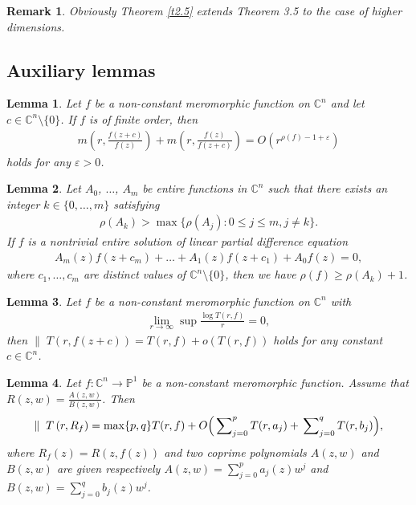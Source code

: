 \documentclass[11pt,reqno]{amsart}
\newtheorem{lem}{Lemma}[section]
\newtheorem{rem}{Remark}[section]
\newcommand{\beas}{\begin{eqnarray*}}
\newcommand{\eeas}{\end{eqnarray*}}
\numberwithin{equation}{section}
\begin{document}
\begin{rem} Obviously Theorem \ref{t2.5} extends Theorem 3.5 \cite{Liu-Dong-2014} to the case of higher dimensions.
\end{rem}

\subsection{{\bf Auxiliary lemmas}}
\begin{lem}\label{L2.1}\cite[Theorem 2.4]{Cao-Xu-2020} Let $f$ be a non-constant meromorphic function on $\mathbb{C}^n$ and let $c \in \mathbb{C}^n\setminus \{0\} $. If $f$ is of finite order, then 
\begin{align*}
 m\left(r,\frac{f(z+c)}{f(z)}\right)+m\left(r, \frac{f(z)}{f(z+c)}\right)=O\left(r^{\rho(f)-1+\varepsilon}\right)
 \end{align*}
holds for any $\varepsilon>0$.
\end{lem}

\begin{lem}\label{L2.2}\cite[Corollary 3.2]{Cao-Xu-2020} Let $A_0$, $\ldots$, $A_m$ be entire functions in $\mathbb{C}^n$ such that there exists an integer $k \in \{0, \ldots, m\}$ satisfying 
\begin{align*}
\rho(A_k)>\max \{\rho(A_j): 0 \le j \le m, j \ne k\}.
\end{align*}
If $f$ is a nontrivial entire solution of linear partial difference equation 
\begin{align*}
A_m(z)f(z+c_m)+\ldots+A_1(z)f(z+c_1)+A_0f(z)=0,
\end{align*}
 where $c_1,\ldots,c_m$ are distinct values of $\mathbb{C}^n\setminus\{0\}$, then we have $\rho(f)\ge \rho(A_k)+1$.
\end{lem}

\begin{lem}\label{L2.3}\cite[Theorem 2.2]{Cao-Xu-2020} Let $f$ be a non-constant meromorphic function on $\mathbb{C}^n$ with 
\begin{align*}
\lim\limits_{r\rightarrow \infty}\sup \frac{\log T(r,f)}{r}=0,
\end{align*}
then $\parallel\;T(r,f(z+c))=T(r,f)+o(T(r,f))$ holds for any constant $c\in\mathbb{C}^n$.
\end{lem}

\begin{lem}\label{L2.4} \cite[Theorem 1.26]{Hu-Li-Yang-2003} Let $f:\mathbb{C}^n\to\mathbb{P}^1$ be a non-constant meromorphic function. Assume that 
$R(z, w)=\frac{A(z, w)}{B(z, w)}$. Then
\beas \parallel\;T\left(r, R_f\right)=\max \{p, q\} T(r, f)+O\Big(\sideset{}{_{j=0}^{p}}{\sum}T(r, a_j)+\sideset{}{_{j=0}^{q}}{\sum}T(r, b_j)\Big),\eeas
where $R_f(z)=R(z, f(z))$ and two coprime polynomials $A(z, w)$ and $B(z,w)$ are given
respectively $A(z,w)=\sum_{j=0}^p a_j(z)w^j$ and $B(z,w)=\sum_{j=0}^q b_j(z)w^j$.
\end{lem}
\end{document}
